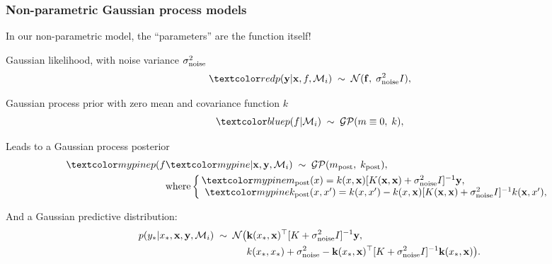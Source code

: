 \begin{frame}
\frametitle{Non-parametric Gaussian process models}

In our non-parametric model, the ``parameters'' are the function itself!

Gaussian likelihood, with noise variance $\sigma_{\rm noise}^2$
\[
\Red{p({\bf y}|{\bf x}, f, \mathcal{M}_i)\;\sim\;
{\cal N}({\bf f},\;\sigma^2_{\rm noise}I),}
\]

Gaussian process prior with zero mean and covariance function $k$
\[
\Blue{p(f|\mathcal{M}_i)\;\sim\;{\cal GP}(m\equiv 0,\;k),}
\]

Leads to a Gaussian process posterior
\[
\begin{split}
\Green{p(f}&\Green{|{\bf x},{\bf y}, \mathcal{M}_i)\;\sim\;{\cal
    GP}(m_{\rm post},\;k_{\rm post}),}\\
&\text{where}\left\{\begin{array}{l}\!\!\Green{m_{\rm post}(x)=k(x,{\bf x})[K({\bf x},{\bf x})+\sigma_{\rm noise}^2I]^{-1}{\bf y},}\\
\Green{k_{\rm post}(x,x')=k(x,x')-k(x,{\bf x})[K({\bf x},{\bf x})+\sigma^2_{\rm noise}I]^{-1}k({\bf x},x'),}\end{array}\right.
\end{split}
\]

And a Gaussian predictive distribution:
\[
\begin{split}
p(y_*|x_*,{\bf x},{\bf y}, \mathcal{M}_i)\;\sim\;{\cal N}\big(&{\bf k}(x_*,{\bf x})^\top
[K+\sigma_{\rm noise}^2I]^{-1}{ \bf y},\\
&k(x_*,x_*)+\sigma_{\rm noise}^2-{\bf k}(x_*,{\bf x})^\top
[K+\sigma_{\rm noise}^2I]^{-1}{\bf k}(x_*,{\bf x})\big).
\end{split}
\]
\end{frame}

